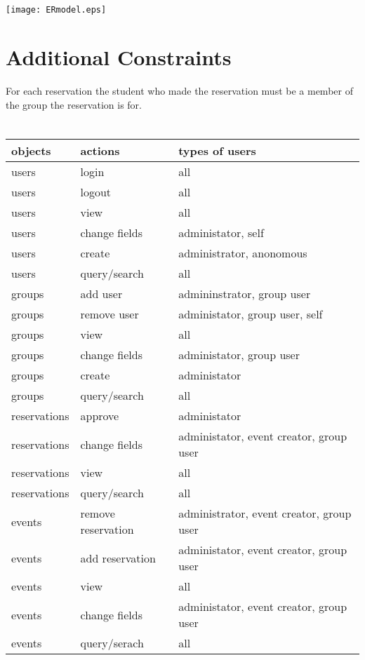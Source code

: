 \documentclass{article}
\begin{document}
\section{}
\texttt{[image: ERmodel.eps]}

\section{Additional Constraints}
For each reservation the student who made the reservation must be a member of
the group the reservation is for. 

\section{}

\begin{tabular}{lll}
\toprule
 objects & actions & types of users\\
\midrule
 users & login & all \\
users & logout & all \\
users & view & all \\
users & change fields & administator, self \\
users & create & administrator, anonomous \\
users & query/search & all \\
groups & add user & admininstrator, group user\\
groups & remove user & administator, group user, self\\ 
groups & view & all\\
groups & change fields & administator, group user\\
groups & create & administator \\
groups & query/search & all \\
reservations & approve & administator \\
reservations & change fields & administator, event creator, group user \\
reservations & view & all \\
reservations & query/search & all \\
events & remove reservation & administrator, event creator, group user \\
events & add reservation & administator, event creator, group user\\
events & view & all \\
events & change fields & administator, event creator, group user \\
events & query/serach & all \\
\bottomrule
\end{tabular}
\end{document}
